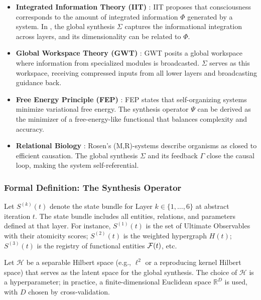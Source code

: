 \begin{itemize}
    \item \textbf{Integrated Information Theory (IIT)} \cite{tononi2004}: IIT proposes that consciousness corresponds to the amount of integrated information $\Phi$ generated by a system. In \Apeiron{}, the global synthesis $\Sigma$ captures the informational integration across layers, and its dimensionality can be related to $\Phi$.
    \item \textbf{Global Workspace Theory (GWT)} \cite{baars1988}: GWT posits a global workspace where information from specialized modules is broadcasted. $\Sigma$ serves as this workspace, receiving compressed inputs from all lower layers and broadcasting guidance back.
    \item \textbf{Free Energy Principle (FEP)} \cite{friston2010}: FEP states that self-organizing systems minimize variational free energy. The synthesis operator $\Psi$ can be derived as the minimizer of a free-energy-like functional that balances complexity and accuracy.
    \item \textbf{Relational Biology} \cite{rosen1991}: Rosen's (M,R)-systems describe organisms as closed to efficient causation. The global synthesis $\Sigma$ and its feedback $\Gamma$ close the causal loop, making the system self-referential.
\end{itemize}

\subsubsection{Formal Definition: The Synthesis Operator}
\begin{definition}
Let $S^{(k)}(t)$ denote the state bundle for Layer $k \in \{1,\dots,6\}$ at abstract iteration $t$. The state bundle includes all entities, relations, and parameters defined at that layer. For instance, $S^{(1)}(t)$ is the set of Ultimate Observables with their atomicity scores; $S^{(2)}(t)$ is the weighted hypergraph $H(t)$; $S^{(3)}(t)$ is the registry of functional entities $\mathcal{F}(t)$, etc.
\end{definition}

\begin{definition}
Let $\mathcal{H}$ be a separable Hilbert space (e.g., $\ell^2$ or a reproducing kernel Hilbert space) that serves as the latent space for the global synthesis. The choice of $\mathcal{H}$ is a hyperparameter; in practice, a finite-dimensional Euclidean space $\mathbb{R}^D$ is used, with $D$ chosen by cross-validation.
\end{definition}

